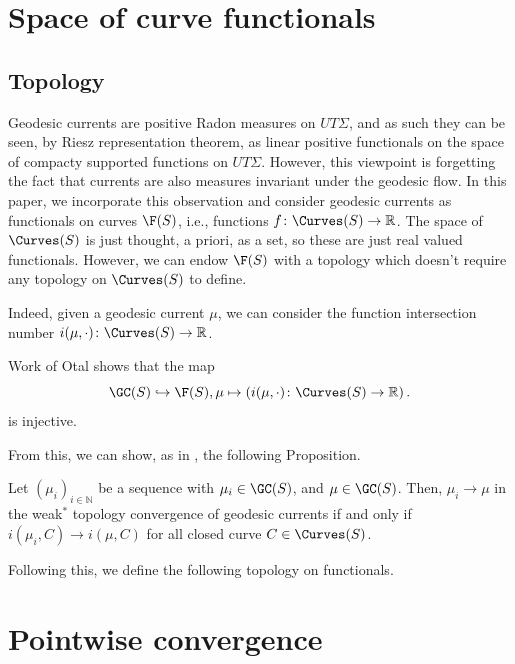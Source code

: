 \section{Space of curve functionals}

\subsection{Topology}

Geodesic currents are positive Radon measures on $UT\Sigma$, and as such they can be seen, by Riesz representation theorem, as linear positive functionals on the space of compacty supported functions on $UT\Sigma$.
However, this viewpoint is forgetting the fact that currents are also measures invariant under the geodesic flow.
In this paper, we incorporate this observation and consider geodesic currents as functionals on curves $\F(S)$, i.e., functions $f \colon \Curves(S) \to \mathbb{R}$.
The space of $\Curves(S)$ is just thought, a priori, as a set, so these are just real valued functionals.
However, we can endow $\F(S)$ with a topology which doesn't require any topology on $\Curves(S)$ to define.

Indeed, given a geodesic current $\mu$, we can consider the function intersection number $i(\mu, \cdot) \colon \Curves(S) \to \mathbb{R}$. 

Work of Otal \cite[Th\`eor\'eme~2]{Otal90:SpectreMarqueNegative} shows that the map
\[
\GC(S) \hookrightarrow \F(S), \mu \mapsto \left( i(\mu,\cdot) \colon \Curves(S) \to \mathbb{R} \right).
\]
is injective.

From this, we can show, as in \cite[Theorem~10]{DLR10:DegenerationFlatMetrics}, the following Proposition.

\begin{proposition}
Let $(\mu_i)_{i \in \mathbb{N}}$ be a sequence with $\mu_i \in \GC(S)$, and $\mu \in \GC(S)$. Then,
$\mu_i \to \mu$ in the weak$^*$ topology convergence of geodesic currents if and only if $i(\mu_i,C) \to i(\mu,C)$ for all closed curve $C \in \Curves(S)$.
\end{proposition}

Following this, we define the following topology on functionals. 

\section{Pointwise convergence}

